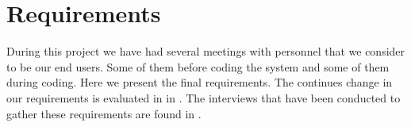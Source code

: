 \section{Requirements}
\label{sec:requirements}
During this project we have had several meetings with personnel that we consider to be our end users.
Some of them before coding the system and some of them during coding.
Here we present the final requirements.
The continues change in our requirements is evaluated in  in .
The interviews that have been conducted to gather these requirements are found in .


